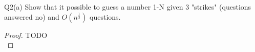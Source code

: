 \begin{problem}
  {Q2(a)}
  Show that it possible to guess a number 1-N given 3 "strikes" (questions answered no) and $O(n^{\frac{1}{3}})$ questions. \\
  \begin{proof}
    TODO\\
  \end{proof}
\end{problem}
